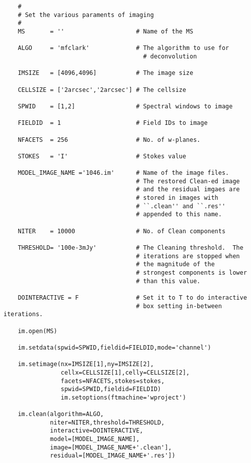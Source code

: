 \small
\begin{verbatim}
    #
    # Set the various paraments of imaging
    #
    MS       = ''                    # Name of the MS

    ALGO     = 'mfclark'             # The algorithm to use for
                                       # deconvolution

    IMSIZE   = [4096,4096]           # The image size

    CELLSIZE = ['2arcsec','2arcsec'] # The cellsize

    SPWID    = [1,2]                 # Spectral windows to image

    FIELDID  = 1                     # Field IDs to image

    NFACETS  = 256                   # No. of w-planes.

    STOKES   = 'I'                   # Stokes value

    MODEL_IMAGE_NAME ='1046.im'      # Name of the image files.
                                     # The restored Clean-ed image
                                     # and the residual imgaes are
                                     # stored in images with
                                     # ``.clean'' and ``.res''
                                     # appended to this name.

    NITER    = 10000                 # No. of Clean components

    THRESHOLD= '100e-3mJy'           # The Cleaning threshold.  The
                                     # iterations are stopped when
                                     # the magnitude of the
                                     # strongest components is lower
                                     # than this value.

    DOINTERACTIVE = F                # Set it to T to do interactive
                                     # box setting in-between iterations.

    im.open(MS)

    im.setdata(spwid=SPWID,fieldid=FIELDID,mode='channel')

    im.setimage(nx=IMSIZE[1],ny=IMSIZE[2],
                cellx=CELLSIZE[1],celly=CELLSIZE[2],
                facets=NFACETS,stokes=stokes,
                spwid=SPWID,fieldid=FIELDID)
                im.setoptions(ftmachine='wproject')

    im.clean(algorithm=ALGO,
             niter=NITER,threshold=THRESHOLD,
             interactive=DOINTERACTIVE,
             model=[MODEL_IMAGE_NAME],
             image=[MODEL_IMAGE_NAME+'.clean'],
             residual=[MODEL_IMAGE_NAME+'.res'])
\end{verbatim}
\normalsize

